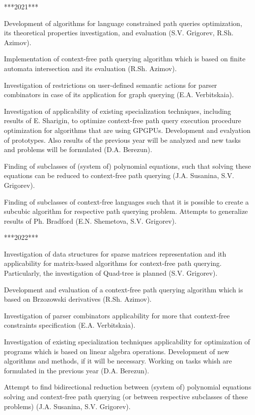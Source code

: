 \documentclass[12pt]{article}  %
\theoremstyle{remark}
\begin{document}
***2021***

Development of algorithms for language constrained path queries optimization, its theoretical properties investigation, and evaluation (S.V. Grigorev, R.Sh. Azimov).

Implementation of context-free path querying algorithm which is based on finite automata intersection and its evaluation (R.Sh. Azimov).

Investigation of restrictions on user-defined semantic actions for parser combinators in case of its application for graph querying (E.A. Verbitskaia).

Investigation of applicability of existing specialization techniques, including results of E. Sharigin, to optimize context-free path query execution procedure optimization for algorithms that are using GPGPUs. Development and evalyation of prototypes. Also results of the previous year will be analyzed and new tasks and problems will be formulated (D.A. Berezun).

Finding of subclasses of (system of) polynomial equations, such that solving these equations can be reduced to context-free path querying (J.A. Susanina, S.V. Grigorev).

Finding of subclasses of context-free languages such that it is possible to create a subcubic algorithm for respective path querying problem. Attempts to generalize results of Ph. Bradford (E.N. Shemetova, S.V. Grigorev).

***2022***

Investigation of data structures for sparse matrices representation and ith applicability for matrix-based algorithms for context-free path querying. Particularly, the investigation of Quad-tree is planned (S.V. Grigorev).

Development and evaluation of a context-free path querying algorithm which is based on Brzozowski derivatives (R.Sh. Azimov).

Investigation of parser combinators applicability for more that context-free constraints specification (E.A. Verbitskaia).

Investigation of existing specialization techniques applicability for optimization of programs which is based on linear algebra operations. Development of new algorithms and methods, if it will be necessary. Working on tasks whish are formulated in the previous year (D.A. Berezun).

Attempt to find bidirectional reduction between (system of) polynomial equations solving and context-free path querying (or between respective subclasses of these problems) (J.A. Susanina, S.V. Grigorev).
\end{document}
